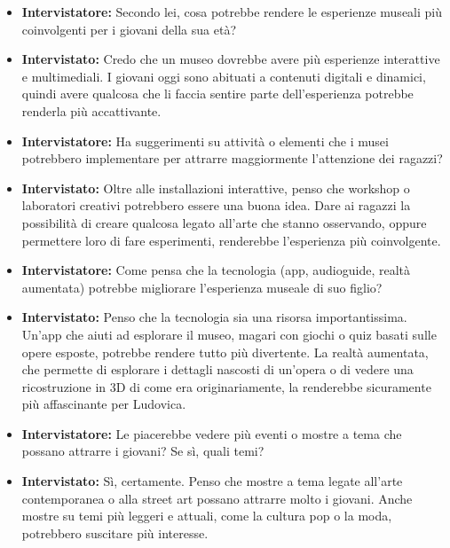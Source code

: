 \documentclass{article}
\begin{document}
\begin{itemize}
    \item \textbf{Intervistatore:} Secondo lei, cosa potrebbe rendere le esperienze museali più coinvolgenti per i giovani della sua età?
    \item \textbf{Intervistato:} Credo che un museo dovrebbe avere più esperienze interattive e multimediali. I giovani oggi sono abituati a contenuti digitali e dinamici, quindi avere qualcosa che li faccia sentire parte dell’esperienza potrebbe renderla più accattivante. 
    
    \item \textbf{Intervistatore:} Ha suggerimenti su attività o elementi che i musei potrebbero implementare per attrarre maggiormente l’attenzione dei ragazzi?
    \item \textbf{Intervistato:} Oltre alle installazioni interattive, penso che workshop o laboratori creativi potrebbero essere una buona idea. Dare ai ragazzi la possibilità di creare qualcosa legato all'arte che stanno osservando, oppure permettere loro di fare esperimenti, renderebbe l'esperienza più coinvolgente.
    
    \item \textbf{Intervistatore:} Come pensa che la tecnologia (app, audioguide, realtà aumentata) potrebbe migliorare l’esperienza museale di suo figlio?
    \item \textbf{Intervistato:} Penso che la tecnologia sia una risorsa importantissima. Un’app che aiuti ad esplorare il museo, magari con giochi o quiz basati sulle opere esposte, potrebbe rendere tutto più divertente. La realtà aumentata, che permette di esplorare i dettagli nascosti di un’opera o di vedere una ricostruzione in 3D di come era originariamente, la renderebbe sicuramente più affascinante per Ludovica.
    
    \item \textbf{Intervistatore:} Le piacerebbe vedere più eventi o mostre a tema che possano attrarre i giovani? Se sì, quali temi?
    \item \textbf{Intervistato:} Sì, certamente. Penso che mostre a tema legate all’arte contemporanea o alla street art possano attrarre molto i giovani. Anche mostre su temi più leggeri e attuali, come la cultura pop o la moda, potrebbero suscitare più interesse.
\end{itemize}
\end{document}

